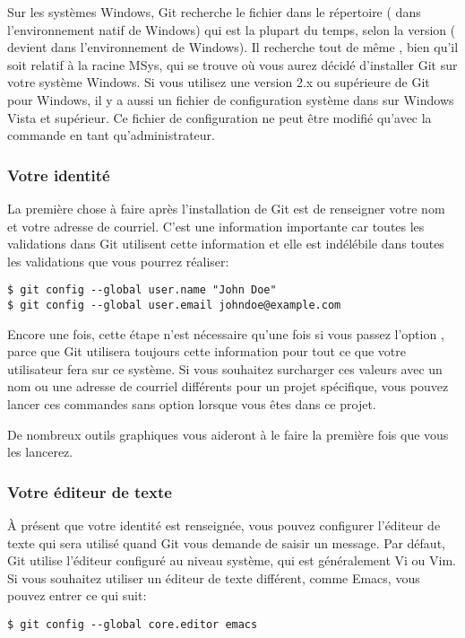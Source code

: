 Sur les systèmes Windows, Git recherche le fichier  dans le répertoire  ( dans l’environnement natif de Windows) qui est  la plupart du temps, selon la version ( devient  dans l’environnement de Windows).
Il recherche tout de même , bien qu'il soit relatif à la racine MSys, qui se trouve où vous aurez décidé d'installer Git sur votre système Windows.
Si vous utilisez une version 2.x ou supérieure de Git pour Windows, il y a aussi un fichier de configuration système dans  sur Windows Vista et supérieur.
Ce fichier de configuration ne peut être modifié qu'avec la commande  en tant qu'administrateur.

\subsubsection{Votre identité}

La première chose à faire après l'installation de Git est de renseigner votre nom et votre adresse de courriel.
C'est une information importante car toutes les validations dans Git utilisent cette information et elle est indélébile dans toutes les validations que vous pourrez réaliser:
\begin{Schunk}
\begin{Verbatim}
$ git config --global user.name "John Doe"
$ git config --global user.email johndoe@example.com
\end{Verbatim}
\end{Schunk}

Encore une fois, cette étape n'est nécessaire qu'une fois si vous passez l'option , parce que Git utilisera toujours cette information pour tout ce que votre utilisateur fera sur ce système.
Si vous souhaitez surcharger ces valeurs avec un nom ou une adresse de courriel différents pour un projet spécifique, vous pouvez lancer ces commandes sans option  lorsque vous êtes dans ce projet.

De nombreux outils graphiques vous aideront à le faire la première fois que vous les lancerez.

\subsubsection{Votre éditeur de texte}

À présent que votre identité est renseignée, vous pouvez configurer l'éditeur de texte qui sera utilisé quand Git vous demande de saisir un message.
Par défaut, Git utilise l'éditeur configuré au niveau système, qui est généralement Vi ou Vim.
Si vous souhaitez utiliser un éditeur de texte différent, comme Emacs, vous pouvez entrer ce qui suit:
\begin{Schunk}
\begin{Verbatim}
$ git config --global core.editor emacs
\end{Verbatim}
\end{Schunk}

